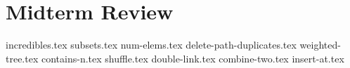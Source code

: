 \documentclass{exam}
\begin{document}
\section{Midterm Review}
\begin{questions}
    {incredibles.tex}
    {subsets.tex}
    \newpage
    {num-elems.tex}
    \newpage
    {delete-path-duplicates.tex}
    {weighted-tree.tex}
    {contains-n.tex}
    {shuffle.tex}
    {double-link.tex}
    {combine-two.tex}
    {insert-at.tex}
\end{questions}
\end{document}
